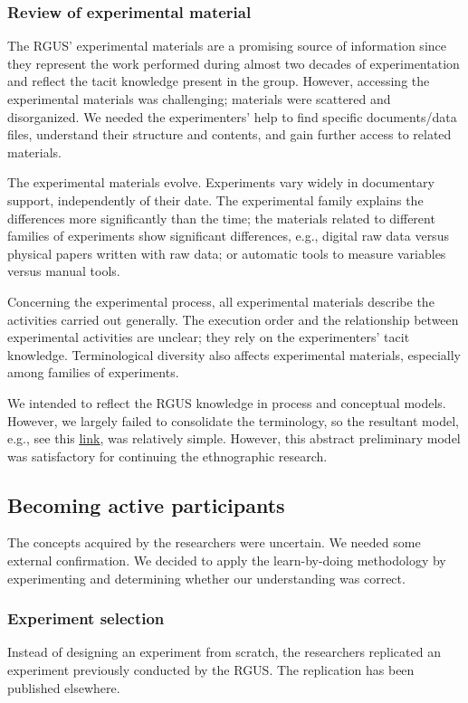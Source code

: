 \subsubsection{Review of experimental material}\label{subsubsec-review-experimental-material}
The RGUS' experimental materials are a promising source of information since they represent the work performed during almost two decades of experimentation and reflect the tacit knowledge \cite{Polanyi-1996-tacit-k} present in the group. However, accessing the experimental materials was challenging; materials were scattered and disorganized. We needed the experimenters' help to find specific documents/data files, understand their structure and contents, and gain further access to related materials.

The experimental materials evolve. Experiments vary widely in documentary support, independently of their date. The experimental family explains the differences more significantly than the time; the materials related to different families of experiments show significant differences, e.g., digital raw data versus physical papers written with raw data; or automatic tools to measure variables versus manual tools.

Concerning the experimental process, all experimental materials describe the activities carried out generally. The execution order and the relationship between experimental activities are unclear; they rely on the experimenters' tacit knowledge. Terminological diversity also affects experimental materials, especially among families of experiments.

We intended to reflect the RGUS knowledge in process and conceptual models. However, we largely failed to consolidate the terminology, so the resultant model, e.g., see this 
\href{https://zenodo.org/record/7093417#.YyjHb-zMLUI}{\ul{link}}, was relatively simple. However, this abstract preliminary model was satisfactory for continuing the ethnographic research.

\subsection{Becoming active participants}\label{replication}
The concepts acquired by the researchers were uncertain. We needed some external confirmation. We decided to apply the learn-by-doing methodology \cite{mendoza-2019-learn-by-doing-methodology} by experimenting and determining whether our understanding was correct.

\subsubsection{Experiment selection}
Instead of designing an experiment from scratch, the researchers replicated an experiment previously conducted by the RGUS. The replication has been published elsewhere.

